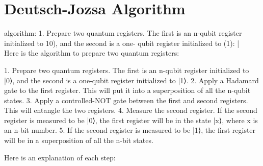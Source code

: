 \documentclass{book}
\begin{document}

	
\section{}
	
	
\section{Deutsch-Jozsa Algorithm}


algorithm:
1. Prepare two quantum registers. The first is an n-qubit register initialized to 10), and the second is a one- qubit register initialized to (1): |%
\\


Here is the algorithm to prepare two quantum registers:


1. Prepare two quantum registers. The first is an n-qubit register initialized to |0⟩, and the second is a one-qubit register initialized to |1⟩.
2. Apply a Hadamard gate to the first register. This will put it into a superposition of all the n-qubit states.
3. Apply a controlled-NOT gate between the first and second registers. This will entangle the two registers.
4. Measure the second register. If the second register is measured to be |0⟩, the first register will be in the state |x⟩, where x is an n-bit number.
5. If the second register is measured to be |1⟩, the first register will be in a superposition of all the n-bit states.


Here is an explanation of each step:
\end{document}
